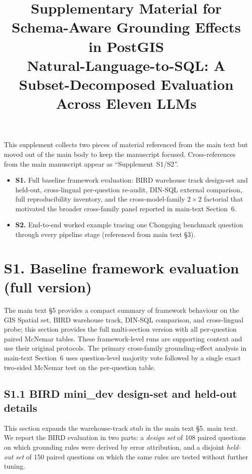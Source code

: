 \documentclass[11pt]{article}
\title{Supplementary Material for\\Schema-Aware Grounding Effects in PostGIS\\
Natural-Language-to-SQL: A Subset-Decomposed Evaluation\\Across Eleven LLMs}
\author{}
\date{}
\begin{document}
\maketitle

\noindent This supplement collects two pieces of material referenced from the main text but moved out of the main body to keep the manuscript focused. Cross-references from the main manuscript appear as ``Supplement~S1/S2''.

\begin{itemize}[leftmargin=*]
\item \textbf{S1.} Full baseline framework evaluation: BIRD warehouse track design-set and held-out, cross-lingual per-question re-audit, DIN-SQL external comparison, full reproducibility inventory, and the cross-model-family $2{\times}2$ factorial that motivated the broader cross-family panel reported in main-text Section~6.
\item \textbf{S2.} End-to-end worked example tracing one Chongqing benchmark question through every pipeline stage (referenced from main text \S3).
\end{itemize}

\section*{S1. Baseline framework evaluation (full version)}

The main text \S5 provides a compact summary of framework behaviour on the GIS Spatial set, BIRD warehouse track, DIN-SQL comparison, and cross-lingual probe; this section provides the full multi-section version with all per-question paired McNemar tables. These framework-level runs are supporting context and use their original protocols. The primary cross-family grounding-effect analysis in main-text Section~6 uses question-level majority vote followed by a single exact two-sided McNemar test on the per-question table.

\subsection*{S1.1 BIRD mini\_dev design-set and held-out details}

This section expands the warehouse-track stub in the main text \S5.
main text. We report the BIRD evaluation in two parts: a \emph{design set} of 108 paired
questions on which grounding rules were derived by error attribution, and a disjoint
\emph{held-out set} of 150 paired questions on which the same rules are tested without
further tuning.
\end{document}
